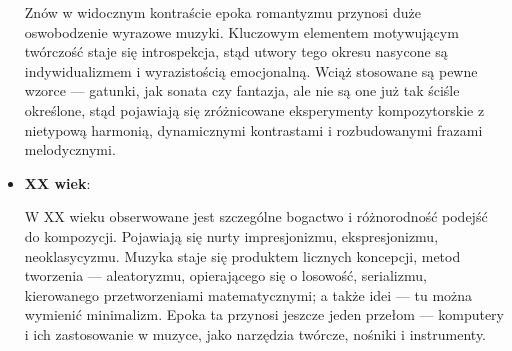 \documentclass[12pt]{article}
\begin{document}
\begin{itemize}
	      Znów w widocznym kontraście epoka romantyzmu przynosi duże oswobodzenie wyrazowe muzyki.
	      Kluczowym elementem motywującym twórczość staje się introspekcja, stąd utwory tego okresu nasycone są indywidualizmem
	      i wyrazistością emocjonalną.
	      Wciąż stosowane są pewne wzorce — gatunki, jak sonata czy fantazja, ale nie są one już tak ściśle określone,
	      stąd pojawiają się zróżnicowane eksperymenty kompozytorskie z nietypową harmonią, dynamicznymi kontrastami i rozbudowanymi
	      frazami melodycznymi.
	\item \textbf{XX wiek}:
	      
	      W XX wieku obserwowane jest szczególne bogactwo i różnorodność podejść do kompozycji.
	      Pojawiają się nurty impresjonizmu, ekspresjonizmu, neoklasycyzmu.
	      Muzyka staje się produktem licznych koncepcji, metod tworzenia — aleatoryzmu, opierającego się o losowość,
	      serializmu, kierowanego przetworzeniami matematycznymi; a także idei — tu można wymienić minimalizm.
	      Epoka ta przynosi jeszcze jeden przełom — komputery i ich zastosowanie w muzyce, jako narzędzia twórcze, nośniki i instrumenty.
\end{itemize}
\end{document}
